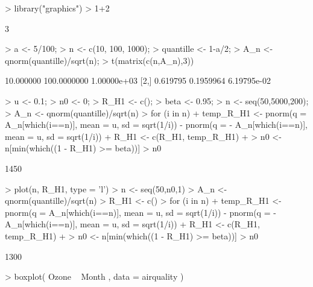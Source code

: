 \documentclass [a4paper]{article}
\begin{document}
\begin{center}
\begin{Schunk}
\begin{Sinput}
> library("graphics")
> 1+2
\end{Sinput}
\begin{Soutput}
[1] 3
\end{Soutput}
\begin{Sinput}
> a <- 5/100;
> n <- c(10, 100, 1000);
> quantille <- 1-a/2;
> A_n <- qnorm(quantille)/sqrt(n);
> t(matrix(c(n,A_n),3))
\end{Sinput}
\begin{Soutput}
          [,1]        [,2]        [,3]
[1,] 10.000000 100.0000000 1.00000e+03
[2,]  0.619795   0.1959964 6.19795e-02
\end{Soutput}
\begin{Sinput}
> u <- 0.1;
> n0 <- 0;
> R_H1 <- c();
> beta <- 0.95;
> n <- seq(50,5000,200);
> A_n <- qnorm(quantille)/sqrt(n)
> for (i in n){
+   temp_R_H1 <- pnorm(q = A_n[which(i==n)], mean = u, sd = sqrt(1/i)) - pnorm(q = - A_n[which(i==n)], mean = u, sd = sqrt(1/i))
+   R_H1 <- c(R_H1, temp_R_H1)
+ }
> n0 <- n[min(which((1 - R_H1) >= beta))]
> n0
\end{Sinput}
\begin{Soutput}
[1] 1450
\end{Soutput}
\begin{Sinput}
> plot(n, R_H1, type = 'l')
> n <- seq(50,n0,1)
> A_n <- qnorm(quantille)/sqrt(n)
> R_H1 <- c()
> for (i in n){
+   temp_R_H1 <- pnorm(q = A_n[which(i==n)], mean = u, sd = sqrt(1/i)) - pnorm(q = - A_n[which(i==n)], mean = u, sd = sqrt(1/i))
+   R_H1 <- c(R_H1, temp_R_H1)
+ }
> n0 <- n[min(which((1 - R_H1) >= beta))]
> n0
\end{Sinput}
\begin{Soutput}
[1] 1300
\end{Soutput}
\begin{Sinput}
> boxplot( Ozone ~ Month , data = airquality )
\end{Sinput}
\end{Schunk}

\end{center}
\end{document}
